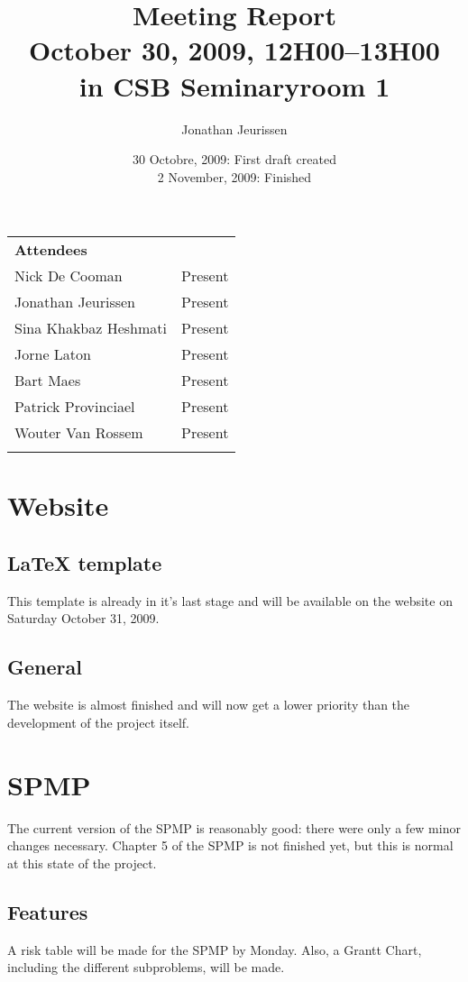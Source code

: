 \documentclass[a4paper, 12pt]{article}
\title{Meeting Report \\
October 30, 2009, 12H00--13H00\\
in CSB Seminaryroom 1}
\author{Jonathan Jeurissen}
\date{30 Octobre, 2009: First draft created \\
	2 November, 2009: Finished}
\begin{document}
	\maketitle	
	\begin{tabular}{l l}
		{\large \textbf{Attendees}} \\
		Nick De Cooman & Present \\
		Jonathan Jeurissen & Present \\
		Sina Khakbaz Heshmati & Present \\
		Jorne Laton & Present \\
		Bart Maes & Present \\
		Patrick Provinciael & Present \\
		Wouter Van Rossem & Present \\
		\\
	\end{tabular}	
	
	
	
	
	\section{Website}
	
	\subsection{\LaTeX{} template}
		This template is already in it's last stage and will be available on the website on Saturday October 31, 2009.
	\subsection{General}
The website is almost finished and will now get a lower priority than the development of the project itself.
	\section{SPMP}
The current version of the SPMP is reasonably good: there were only a few minor changes necessary. Chapter 5 of the SPMP is not finished yet, but this is normal at this state of the project.
	\subsection{Features}
A risk table will be made for the SPMP by Monday. Also, a Grantt Chart, including the different subproblems, will be made.
\end{document}
